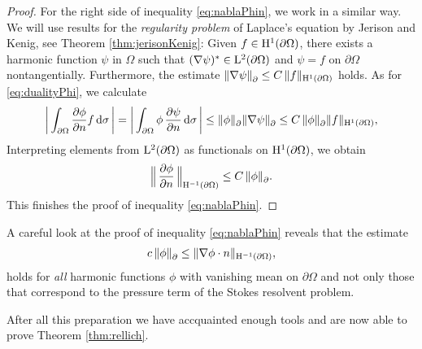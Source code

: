 \begin{proof}
  For the right side of inequality \eqref{eq:nablaPhin}, we work in a similar way.
  We will use results for the \emph{regularity problem} of Laplace's equation by Jerison and Kenig, see Theorem \ref{thm:jerisonKenig}:
  Given $f \in \mathrm{H}^1(\partial\Omega)$, there exists a harmonic function $\psi$ in $\Omega$ such that $(\nabla\psi)^* \in \mathrm{L}^2(\partial\Omega)$ and $\psi = f$ on $\partial\Omega$ nontangentially. Furthermore, the estimate $\|\nabla \psi\|^{}_\partial \leq C\, \|f\|_{\mathrm{H}^1(\partial\Omega)}$ holds.
  As for \eqref{eq:dualityPhi}, we calculate
  \begin{align*}
    \bigg| \int_{\partial\Omega} \frac{\partial\phi}{\partial n} f \, {\operatorname{d}\!{\sigma}}\, \bigg|
    = \bigg| \int_{\partial\Omega} \phi\, \frac{\partial \psi}{\partial n} \, {\operatorname{d}\!{\sigma}}\, \bigg| 
    \leq \|\phi\|^{}_{\partial} \|\nabla \psi \|^{}_\partial 
    \leq C\, \|\phi\|^{}_\partial \|f\|_{\mathrm{H}^1(\partial\Omega)},
  \end{align*}
  Interpreting elements from $\mathrm{L}^2(\partial\Omega)$ as functionals on $\mathrm{H}^1(\partial\Omega)$, we obtain
  \begin{align*}
      \Big\|\,\frac{\partial\phi}{\partial n}\, \Big\|_{\mathrm{H}^{-1}(\partial\Omega)} \leq C\, \|\phi\|^{}_\partial. 
  \end{align*}
  This finishes the proof of inequality \eqref{eq:nablaPhin}.
\end{proof}

\begin{rem}
  \label{rem:harmonicEstimate}
  A careful look at the proof of inequality \eqref{eq:nablaPhin} reveals that the estimate
  \begin{align*}
      c\, \| \phi \|^{}_\partial \leq \| \nabla \phi \cdot n \|_{\mathrm{H}^{-1}(\partial\Omega)},
  \end{align*}
  holds for \emph{all} harmonic functions $\phi$ with vanishing mean on $\partial\Omega$ and not only those that correspond to the pressure term of the Stokes resolvent problem.
\end{rem}

After all this preparation we have accquainted enough tools and are now able to prove Theorem \ref{thm:rellich}.

